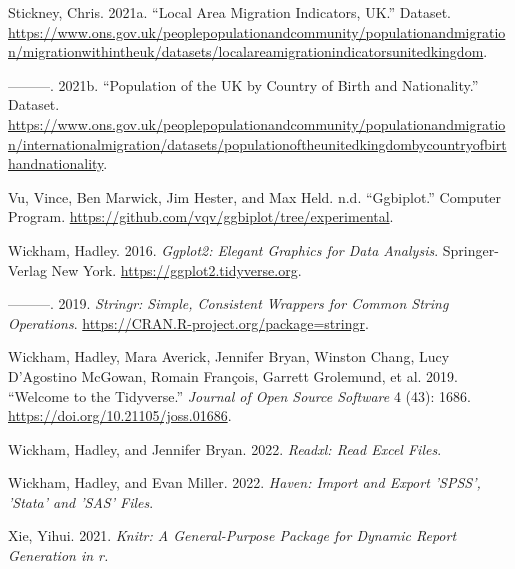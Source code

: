 \documentclass{article}
\newlength{\cslhangindent}
\newlength{\cslentryspacingunit} %
\newenvironment{CSLReferences}[2] %
 {%
  \setlength{\parindent}{0pt}
  \ifodd #1
  \let\oldpar\par
  \def\par{\hangindent=\cslhangindent\oldpar}
  \fi
  \setlength{\parskip}{#2\cslentryspacingunit}
 }%
 {}
\begin{document}
\begin{CSLReferences}{1}{0}
\leavevmode{}%
Stickney, Chris. 2021a. {``Local Area Migration Indicators, UK.''}
Dataset.
\url{https://www.ons.gov.uk/peoplepopulationandcommunity/populationandmigration/migrationwithintheuk/datasets/localareamigrationindicatorsunitedkingdom}.

\leavevmode{}%
---------. 2021b. {``Population of the UK by Country of Birth and
Nationality.''} Dataset.
\url{https://www.ons.gov.uk/peoplepopulationandcommunity/populationandmigration/internationalmigration/datasets/populationoftheunitedkingdombycountryofbirthandnationality}.

\leavevmode{}%
Vu, Vince, Ben Marwick, Jim Hester, and Max Held. n.d. {``Ggbiplot.''}
Computer Program.
\url{https://github.com/vqv/ggbiplot/tree/experimental}.

\leavevmode{}%
Wickham, Hadley. 2016. \emph{Ggplot2: Elegant Graphics for Data
Analysis}. Springer-Verlag New York.
\url{https://ggplot2.tidyverse.org}.

\leavevmode{}%
---------. 2019. \emph{Stringr: Simple, Consistent Wrappers for Common
String Operations}. \url{https://CRAN.R-project.org/package=stringr}.

\leavevmode{}%
Wickham, Hadley, Mara Averick, Jennifer Bryan, Winston Chang, Lucy
D'Agostino McGowan, Romain François, Garrett Grolemund, et al. 2019.
{``Welcome to the Tidyverse.''} \emph{Journal of Open Source Software} 4
(43): 1686. \url{https://doi.org/10.21105/joss.01686}.

\leavevmode{}%
Wickham, Hadley, and Jennifer Bryan. 2022. \emph{Readxl: Read Excel
Files}.

\leavevmode{}%
Wickham, Hadley, and Evan Miller. 2022. \emph{Haven: Import and Export
'SPSS', 'Stata' and 'SAS' Files}.

\leavevmode{}%
Xie, Yihui. 2021. \emph{Knitr: A General-Purpose Package for Dynamic
Report Generation in r.}

\end{CSLReferences}



\end{document}
